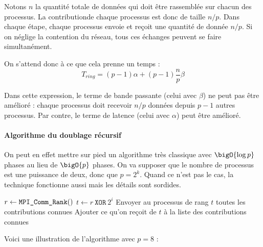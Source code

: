 Notons $n$ la quantité totale de données qui doit être rassemblée sur
chacun des processus. La \og contribution\fg de chaque processus est
donc de taille $n/p$. Dans chaque étape, chaque processus envoie et
reçoit une quantité de donnée $n/p$. Si on néglige la contention du
réseau, tous ces échanges peuvent se faire simultanément.

On s'attend donc à ce que cela prenne un temps :
\[
T_{ring} = (p-1) \alpha + (p-1)\frac{n}{p} \beta
\]

Dans cette expression, le terme de bande passante (celui avec $\beta$)
ne peut pas être amélioré : chaque processus doit recevoir $n/p$
données depuis $p-1$ autres processus. Par contre, le terme de latence
(celui avec $\alpha$) peut être amélioré.

\paragraph{Algorithme du doublage récursif} On peut en effet mettre
sur pied un algorithme très classique avec $\bigO{\log p}$ phases au
lieu de $\bigO{p}$ phases. On va supposer que le nombre de processus
est une puissance de deux, donc que $p=2^k$. Quand ce n'est pas le
cas, la technique fonctionne aussi mais les détails sont sordides.

\begin{algorithmic}[1]
  \State $r \gets \verb|MPI_Comm_Rank|()$
  \State $t \gets r ~ \texttt{XOR} ~ 2^i$
  \State Envoyer au processus de rang $t$ toutes les contributions connues
  \State Ajouter ce qu'on reçoit de $t$ à la liste des contributions connues
  \EndFor
\end{algorithmic}

Voici une illustration de l'algorithme avec $p=8$ :
\begin{center}
\end{center}

